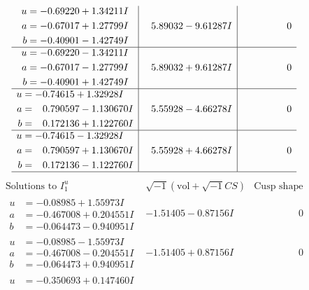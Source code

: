 \documentclass[1p]{elsarticle_modified}
\theoremstyle{definition}
\newcommand{\I}{\sqrt{-1}}
\begin{document}
$$\begin{array}{c|c|c}
\begin{aligned}
u &= -0.69220 + 1.34211 I \\
a &= -0.67017 + 1.27799 I \\
b &= -0.40901 - 1.42749 I\end{aligned}
 & \phantom{-}5.89032 - 9.61287 I & \phantom{-0.000000 } 0 \\ \hline\begin{aligned}
u &= -0.69220 - 1.34211 I \\
a &= -0.67017 - 1.27799 I \\
b &= -0.40901 + 1.42749 I\end{aligned}
 & \phantom{-}5.89032 + 9.61287 I & \phantom{-0.000000 } 0 \\ \hline\begin{aligned}
u &= -0.74615 + 1.32928 I \\
a &= \phantom{-}0.790597 - 1.130670 I \\
b &= \phantom{-}0.172136 + 1.122760 I\end{aligned}
 & \phantom{-}5.55928 - 4.66278 I & \phantom{-0.000000 } 0 \\ \hline\begin{aligned}
u &= -0.74615 - 1.32928 I \\
a &= \phantom{-}0.790597 + 1.130670 I \\
b &= \phantom{-}0.172136 - 1.122760 I\end{aligned}
 & \phantom{-}5.55928 + 4.66278 I & \phantom{-0.000000 } 0\\
 \hline 
 \end{array}$$\newpage$$\begin{array}{c|c|c}  
\text{Solutions to }I^u_{1}& \I (\text{vol} + \sqrt{-1}CS) & \text{Cusp shape}\\
 \hline 
\begin{aligned}
u &= -0.08985 + 1.55973 I \\
a &= -0.467008 + 0.204551 I \\
b &= -0.064473 - 0.940951 I\end{aligned}
 & -1.51405 - 0.87156 I & \phantom{-0.000000 } 0 \\ \hline\begin{aligned}
u &= -0.08985 - 1.55973 I \\
a &= -0.467008 - 0.204551 I \\
b &= -0.064473 + 0.940951 I\end{aligned}
 & -1.51405 + 0.87156 I & \phantom{-0.000000 } 0 \\ \hline\begin{aligned}
u &= -0.350693 + 0.147460 I \\

\end{aligned}
\end{array}$$
\end{document}
